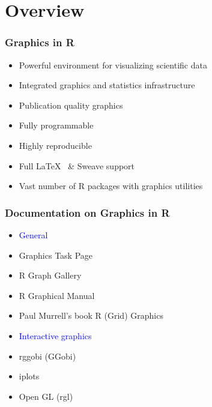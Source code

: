 \documentclass{beamer}
\begin{document}
\section{Overview}
\begin{frame}[containsverbatim]  
	\frametitle{Graphics in R}
\begin{itemize}
        \item Powerful environment for visualizing scientific data
        \item Integrated graphics and statistics infrastructure
        \item Publication quality graphics
        \item Fully programmable 
        \item Highly reproducible
	\item Full \LaTeX\ \href{http://www.latex-project.org/}{{}} \& Sweave \href{http://www.stat.auckland.ac.nz/~dscott/782/Sweave-manual-20060104.pdf}{{}} support
        \item Vast number of R packages with graphics utilities
\end{itemize}
\end{frame}
\begin{frame}[containsverbatim]  
	\frametitle{Documentation on Graphics in R}
\begin{itemize}
        \item[] \hspace{-0.8cm} \textcolor{blue}{General}
        \item Graphics Task Page \href{http://cran.r-project.org/web/views/Graphics.html}{{}} 
        \item R Graph Gallery \href{http://addictedtor.free.fr/graphiques/allgraph.php}{{}}
        \item R Graphical Manual \href{http://cged.genes.nig.ac.jp/RGM2/index.php}{{}}
        \item Paul Murrell's book R (Grid) Graphics \href{http://www.stat.auckland.ac.nz/~paul/RGraphics/rgraphics.html}{{}}
\end{itemize}

\begin{itemize}
        \item[] \hspace{-0.8cm} \textcolor{blue}{Interactive graphics}
        \item rggobi (GGobi) \href{http://www.ggobi.org/}{{}}
        \item iplots \href{http://www.rosuda.org/iplots/}{{}}
        \item Open GL (rgl) \href{http://rgl.neoscientists.org/gallery.shtml}{{}}
\end{itemize}
\end{frame}
\end{document}
